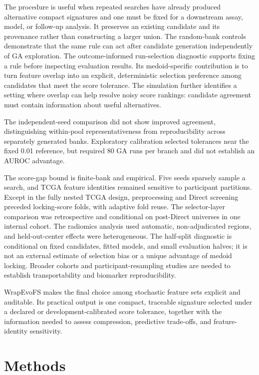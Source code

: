 The procedure is useful when repeated searches have already produced alternative compact signatures and one must be fixed for a downstream assay, model, or follow-up analysis. It preserves an existing candidate and its provenance rather than constructing a larger union. The random-bank controls demonstrate that the same rule can act after candidate generation independently of GA exploration. The outcome-informed run-selection diagnostic supports fixing a rule before inspecting evaluation results. Its medoid-specific contribution is to turn feature overlap into an explicit, deterministic selection preference among candidates that meet the score tolerance. The simulation further identifies a setting where overlap can help resolve noisy score rankings: candidate agreement must contain information about useful alternatives.

The independent-seed comparison did not show improved agreement, distinguishing within-pool representativeness from reproducibility across separately generated banks. Exploratory calibration selected tolerances near the fixed 0.01 reference, but required 80 GA runs per branch and did not establish an AUROC advantage.

The score-gap bound is finite-bank and empirical. Five seeds sparsely sample a search, and TCGA feature identities remained sensitive to participant partitions. Except in the fully nested TCGA design, preprocessing and Direct screening preceded locking-score folds, with adaptive fold reuse. The selector-layer comparison was retrospective and conditional on post-Direct universes in one internal cohort. The radiomics analysis used automatic, non-adjudicated regions, and held-out-center effects were heterogeneous. The half-split diagnostic is conditional on fixed candidates, fitted models, and small evaluation halves; it is not an external estimate of selection bias or a unique advantage of medoid locking. Broader cohorts and participant-resampling studies are needed to establish transportability and biomarker reproducibility.

WrapEvoFS makes the final choice among stochastic feature sets explicit and auditable. Its practical output is one compact, traceable signature selected under a declared or development-calibrated score tolerance, together with the information needed to assess compression, predictive trade-offs, and feature-identity sensitivity.

\FloatBarrier
\section{Methods}

